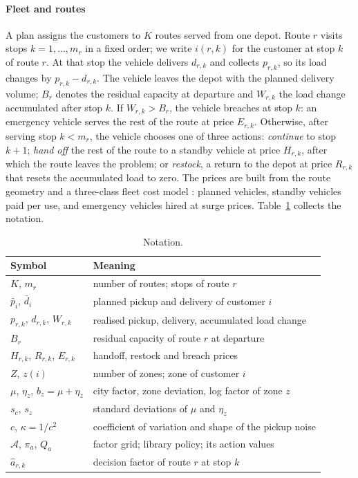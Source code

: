 \documentclass[preprint,authoryear,12pt]{elsarticle}
\begin{document}
\paragraph{Fleet and routes} A plan assigns the customers to $K$ routes
served from one depot. Route $r$ visits stops $k=1,\dots,m_r$ in a fixed
order; we write $i(r,k)$ for the customer at stop $k$ of route $r$. At
that stop the vehicle delivers $d_{r,k}$ and collects $p_{r,k}$, so its
load changes by $p_{r,k} - d_{r,k}$. The vehicle leaves the depot with
the planned delivery volume; $B_r$ denotes the residual capacity at
departure and $W_{r,k}$ the load change accumulated after stop $k$. If
$W_{r,k} > B_r$, the vehicle breaches at stop $k$: an emergency vehicle
serves the rest of the route at price $E_{r,k}$. Otherwise, after
serving stop $k < m_r$, the vehicle chooses one of three actions:
\emph{continue} to stop $k+1$; \emph{hand off} the rest of the route to
a standby vehicle at price $H_{r,k}$, after which the route leaves the
problem; or \emph{restock}, a return to the depot at price $R_{r,k}$
that resets the accumulated load to zero. The prices are built from
the route geometry and a three-class fleet cost model
\citep{dang2026baton}: planned vehicles, standby vehicles paid per use,
and emergency vehicles hired at surge prices. Table~\ref{tab:notation}
collects the notation.

\begin{table}[t]
\centering\footnotesize
\caption{Notation.}\label{tab:notation}
\begin{tabular}{ll}
\toprule
Symbol & Meaning \\
\midrule
$K$, $m_r$ & number of routes; stops of route $r$ \\
$\bar p_i$, $\bar d_i$ & planned pickup and delivery of customer $i$ \\
$p_{r,k}$, $d_{r,k}$, $W_{r,k}$ & realised pickup, delivery, accumulated load change \\
$B_r$ & residual capacity of route $r$ at departure \\
$H_{r,k}$, $R_{r,k}$, $E_{r,k}$ & handoff, restock and breach prices \\
$Z$, $z(i)$ & number of zones; zone of customer $i$ \\
$\mu$, $\eta_z$, $b_z = \mu + \eta_z$ & city factor, zone deviation, log factor of zone $z$ \\
$s_c$, $s_z$ & standard deviations of $\mu$ and $\eta_z$ \\
$c$, $\kappa = 1/c^2$ & coefficient of variation and shape of the pickup noise \\
$\mathcal{A}$, $\pi_a$, $Q_a$ & factor grid; library policy; its action values \\
$\hat a_{r,k}$ & decision factor of route $r$ at stop $k$ \\
\bottomrule
\end{tabular}
\end{table}
\end{document}
